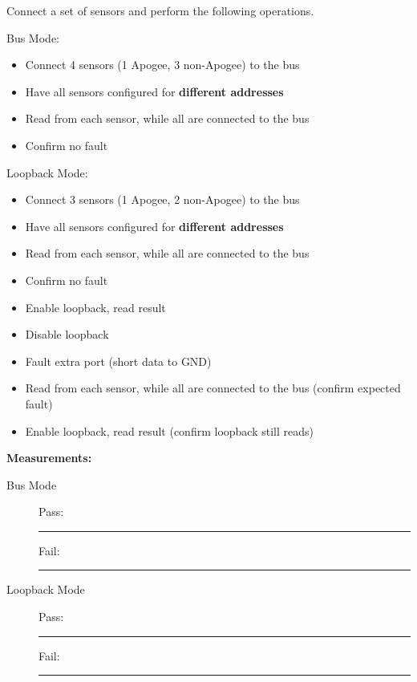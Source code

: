 Connect a set of sensors and perform the following operations. 


{\large Bus Mode: }
\begin{itemize}
\item Connect 4 sensors (1 Apogee, 3 non-Apogee) to the bus
\item Have all sensors configured for \textbf{different addresses}
\item Read from each sensor, while all are connected to the bus
\item Confirm no fault
\end{itemize}

{\large Loopback Mode: }
\begin{itemize}
\item Connect 3 sensors (1 Apogee, 2 non-Apogee) to the bus
\item Have all sensors configured for \textbf{different addresses}
\item Read from each sensor, while all are connected to the bus
\item Confirm no fault
\item Enable loopback, read result
\item Disable loopback
\item Fault extra port (short data to GND)
\item Read from each sensor, while all are connected to the bus (confirm expected fault)
\item Enable loopback, read result (confirm loopback still reads)
\end{itemize}


{\Large \textbf{Measurements:}}
\begin{description}
\item [Bus Mode] \hfill Pass: \rule{1cm}{0.15mm} \hspace{1cm} Fail: \rule{1cm}{0.15mm}
\item [Loopback Mode] \hfill Pass: \rule{1cm}{0.15mm} \hspace{1cm} Fail: \rule{1cm}{0.15mm}
\end{description}

